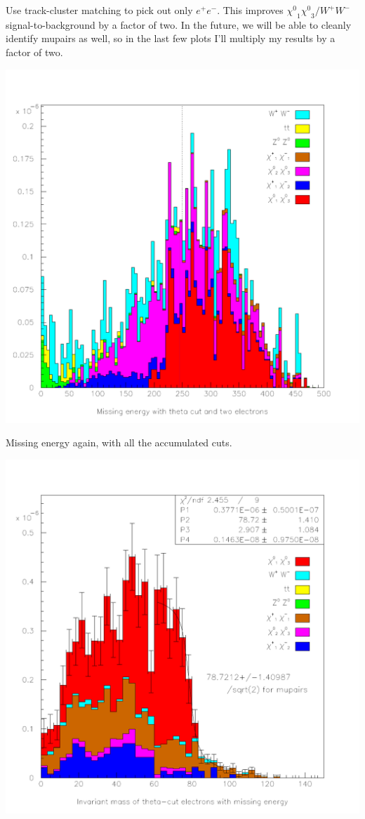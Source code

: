 \documentclass[landscape]{article}
\begin{document}
Use track-cluster matching to pick out only $e^+e^-$.  This improves
$\mbox{$\chi^0$}_1 \mbox{$\chi^0$}_3 / W^+W^-$ signal-to-background by
a factor of two.  In the future, we will be able to cleanly identify
mupairs as well, so in the last few plots I'll multiply my results by
a factor of two.

\pagebreak

\begin{center} \includegraphics[height=0.8\textheight]{withtheta_5.pdf} \end{center}

Missing energy again, with all the accumulated cuts.

\pagebreak

\begin{center} \includegraphics[height=0.8\textheight]{withtheta_6.pdf} \end{center}
\end{document}
